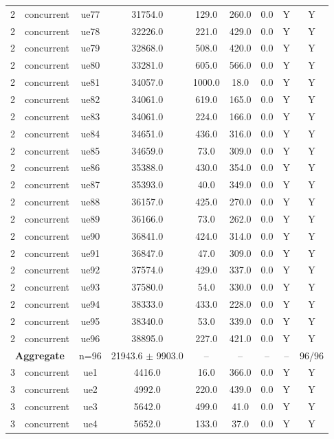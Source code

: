 \begin{table}[ht]
\begin{tabular}{|c|c|c|c|c|c|c|c|c|}
2 & concurrent & ue77 & 31754.0 & 129.0 & 260.0 & 0.0 & Y & Y \\
2 & concurrent & ue78 & 32226.0 & 221.0 & 429.0 & 0.0 & Y & Y \\
2 & concurrent & ue79 & 32868.0 & 508.0 & 420.0 & 0.0 & Y & Y \\
2 & concurrent & ue80 & 33281.0 & 605.0 & 566.0 & 0.0 & Y & Y \\
2 & concurrent & ue81 & 34057.0 & 1000.0 & 18.0 & 0.0 & Y & Y \\
2 & concurrent & ue82 & 34061.0 & 619.0 & 165.0 & 0.0 & Y & Y \\
2 & concurrent & ue83 & 34061.0 & 224.0 & 166.0 & 0.0 & Y & Y \\
2 & concurrent & ue84 & 34651.0 & 436.0 & 316.0 & 0.0 & Y & Y \\
2 & concurrent & ue85 & 34659.0 & 73.0 & 309.0 & 0.0 & Y & Y \\
2 & concurrent & ue86 & 35388.0 & 430.0 & 354.0 & 0.0 & Y & Y \\
2 & concurrent & ue87 & 35393.0 & 40.0 & 349.0 & 0.0 & Y & Y \\
2 & concurrent & ue88 & 36157.0 & 425.0 & 270.0 & 0.0 & Y & Y \\
2 & concurrent & ue89 & 36166.0 & 73.0 & 262.0 & 0.0 & Y & Y \\
2 & concurrent & ue90 & 36841.0 & 424.0 & 314.0 & 0.0 & Y & Y \\
2 & concurrent & ue91 & 36847.0 & 47.0 & 309.0 & 0.0 & Y & Y \\
2 & concurrent & ue92 & 37574.0 & 429.0 & 337.0 & 0.0 & Y & Y \\
2 & concurrent & ue93 & 37580.0 & 54.0 & 330.0 & 0.0 & Y & Y \\
2 & concurrent & ue94 & 38333.0 & 433.0 & 228.0 & 0.0 & Y & Y \\
2 & concurrent & ue95 & 38340.0 & 53.0 & 339.0 & 0.0 & Y & Y \\
2 & concurrent & ue96 & 38895.0 & 227.0 & 421.0 & 0.0 & Y & Y \\
\multicolumn{2}{|c|}{\textbf{Aggregate}} & n=96 & 21943.6 $\pm$ 9903.0 & -- & -- & -- & -- & 96/96 \\
\hline
3 & concurrent & ue1 & 4416.0 & 16.0 & 366.0 & 0.0 & Y & Y \\
3 & concurrent & ue2 & 4992.0 & 220.0 & 439.0 & 0.0 & Y & Y \\
3 & concurrent & ue3 & 5642.0 & 499.0 & 41.0 & 0.0 & Y & Y \\
3 & concurrent & ue4 & 5652.0 & 133.0 & 37.0 & 0.0 & Y & Y \\

\end{tabular}
\end{table}
